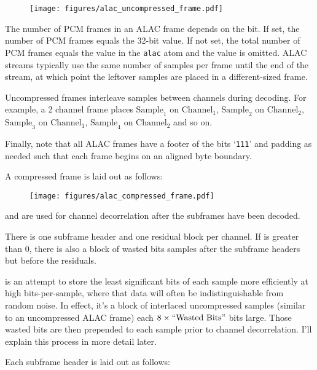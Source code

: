 \begin{figure}[h]
\texttt{[image: figures/alac\_uncompressed\_frame.pdf]}
\end{figure}
\par
\noindent
The number of PCM frames in an ALAC frame depends on the 
bit.
If set, the number of PCM frames equals the 32-bit 
value.
If not set, the total number of PCM frames equals the 
value in the \texttt{alac} atom and the  value is omitted.
ALAC streams typically use the same number of samples per frame
until the end of the stream, at which point the leftover samples
are placed in a different-sized frame.

Uncompressed frames interleave samples between channels during decoding.
For example, a 2 channel frame places $\text{Sample}_1$ on $\text{Channel}_1$,
$\text{Sample}_2$ on $\text{Channel}_2$,
$\text{Sample}_3$ on $\text{Channel}_1$,
$\text{Sample}_4$ on $\text{Channel}_2$ and so on.

Finally, note that all ALAC frames have a footer of the bits `\texttt{111}'
and padding as needed such that each frame begins on an aligned byte boundary.

\pagebreak

A compressed frame is laid out as follows:

\begin{figure}[h]
\texttt{[image: figures/alac\_compressed\_frame.pdf]}
\end{figure}
\par
\noindent
{} and  are used
for channel decorrelation after the subframes have been decoded.

There is one subframe header and one residual block per
channel.
If  is greater than 0, there is also
a block of wasted bits samples after the subframe headers but before
the residuals.

 is an attempt to store the least significant bits
of each sample more efficiently at high bits-per-sample, where
that data will often be indistinguishable from random noise.
In effect, it's a block of interlaced uncompressed samples
(similar to an uncompressed ALAC frame) each $8 \times \text{``{Wasted Bits}''}$
bits large.
Those wasted bits are then prepended to each sample prior to channel
decorrelation.
I'll explain this process in more detail later.

Each subframe header is laid out as follows:


